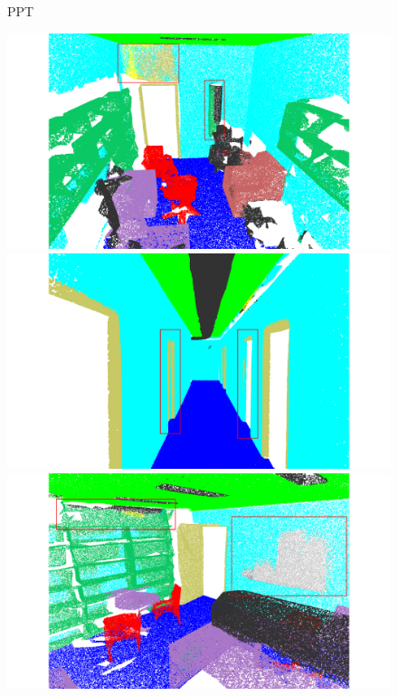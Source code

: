 \begin{figure}[htbp]
    \begin{minipage}{0.09\textwidth}
        \centering
        PPT
    \end{minipage}
    \hfill
    \begin{minipage}{0.22\textwidth}
        \centering
        \includegraphics[width=\textwidth]{fig/supplement/semantic_segmentation/office_9/PPT_office_9.pdf}
    \end{minipage}
    \hfill
     \begin{minipage}{0.22\textwidth}
        \centering
        \includegraphics[width=\textwidth]{fig/supplement/semantic_segmentation/hallway_10/PPT_hallway_10.pdf}
    \end{minipage}
    \hfill
    \begin{minipage}{0.22\textwidth}
        \centering
        \includegraphics[width=\textwidth]{fig/supplement/semantic_segmentation/office_35/PPT_office_35.pdf}

\end{minipage}
\end{figure}
